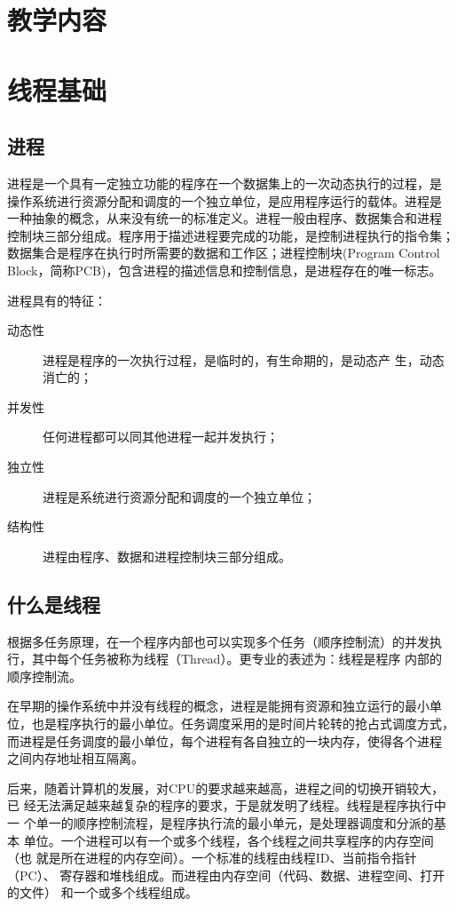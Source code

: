 \newpage
\section*{教学内容}

\section{线程基础}

\subsection{进程}

进程是一个具有一定独立功能的程序在一个数据集上的一次动态执行的过程，是
操作系统进行资源分配和调度的一个独立单位，是应用程序运行的载体。进程是
一种抽象的概念，从来没有统一的标准定义。进程一般由程序、数据集合和进程
控制块三部分组成。程序用于描述进程要完成的功能，是控制进程执行的指令集；
数据集合是程序在执行时所需要的数据和工作区；进程控制块(Program Control
Block，简称PCB)，包含进程的描述信息和控制信息，是进程存在的唯一标志。

进程具有的特征：

\begin{description}
\item[动态性] 进程是程序的一次执行过程，是临时的，有生命期的，是动态产
  生，动态消亡的；
\item[并发性] 任何进程都可以同其他进程一起并发执行；
\item[独立性] 进程是系统进行资源分配和调度的一个独立单位；
\item[结构性] 进程由程序、数据和进程控制块三部分组成。
\end{description}

\subsection{什么是线程}

根据多任务原理，在一个程序内部也可以实现多个任务（顺序控制流）的并发执
行，其中每个任务被称为线程（Thread）。更专业的表述为：{\hei 线程是程序
  内部的顺序控制流。}

在早期的操作系统中并没有线程的概念，进程是能拥有资源和独立运行的最小单
位，也是程序执行的最小单位。任务调度采用的是时间片轮转的抢占式调度方式，
而进程是任务调度的最小单位，每个进程有各自独立的一块内存，使得各个进程
之间内存地址相互隔离。

后来，随着计算机的发展，对CPU的要求越来越高，进程之间的切换开销较大，已
经无法满足越来越复杂的程序的要求，于是就发明了线程。线程是程序执行中一
个单一的顺序控制流程，是程序执行流的最小单元，是处理器调度和分派的基本
单位。一个进程可以有一个或多个线程，各个线程之间共享程序的内存空间（也
就是所在进程的内存空间）。一个标准的线程由线程ID、当前指令指针（PC）、
寄存器和堆栈组成。而进程由内存空间（代码、数据、进程空间、打开的文件）
和一个或多个线程组成。

